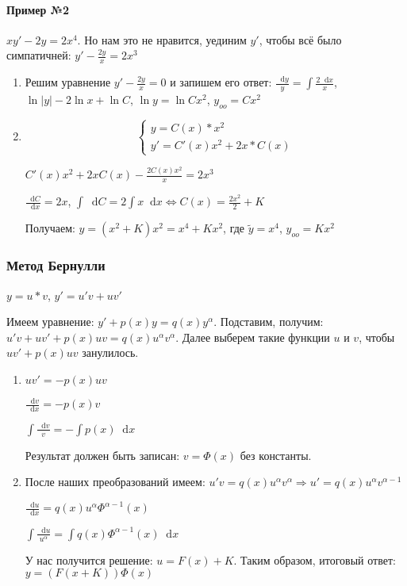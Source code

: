 \documentclass{article}
\newcommand*\diff{\mathop{}\!\mathrm{d}}
\begin{document}
\paragraph{Пример №2}

$x y' - 2y = 2x^4$. Но нам это не нравится, уединим $y'$, чтобы всё было симпатичней: $y' - \frac{2y}{x} = 2x^3$

\begin{enumerate}
    \item Решим уравнение $y' - \frac{2y}{x} = 0$ и запишем его ответ: $\frac{\diff y}{y} = \int \frac{2 \diff x}{x}$, $\ln |y| - 2 \ln x + \ln C$, $\ln y = \ln C x^2$, $y_{oo} = Cx^2$
    \item $$\begin{cases}
        y = C(x) * x^2 \\
        y' = C'(x) x^2 + 2x * C(x)
    \end{cases}$$

    $C'(x) x^2 + 2x C(x) - \frac{2 C(x) x^2}{x} = 2x^3$

    $\frac{\diff C}{\diff x} = 2x$, $\int \diff C = 2 \int x \diff x \Longleftrightarrow C(x) = \frac{2x^2}{2} + K$

    Получаем: $y = (x^2 + K) x^2 = x^4 + Kx^2$, где $\tilde{y} = x^4$, $y_{oo} = Kx^2$
\end{enumerate}

\subsubsection{Метод Бернулли}

$y = u * v$, $y' = u' v + u v'$

Имеем уравнение: $y' + p(x) y = q(x) y^{\alpha}$. Подставим, получим: $u' v + u v' + p(x) u v = q(x) u^\alpha v^\alpha$. Далее выберем такие функции $u$ и $v$, чтобы $uv' + p(x) u v$ занулилось.

\begin{enumerate}
    \item $uv' = -p(x) u v$

    $\frac{\diff v}{\diff x} = - p(x) v$

    $\int\frac{\diff v}{v} = - \int p(x) \diff x$

    Результат должен быть записан: $v = \Phi(x)$ без константы.
    \item После наших преобразований имеем: $u' v = q(x) u^\alpha v^\alpha \Longrightarrow u' = q(x) u^\alpha v^{\alpha - 1}$
    
    $\frac{\diff u}{\diff x} = q(x) u^\alpha \Phi^{\alpha - 1}(x)$

    $\int \frac{\diff u}{u^{\alpha}} = \int q(x) \Phi^{\alpha - 1}(x) \diff x$

    У нас получится решение: $u = F(x) + K$. Таким образом, итоговый ответ: $y = (F(x + K)) \Phi(x)$
\end{enumerate}
\end{document}
